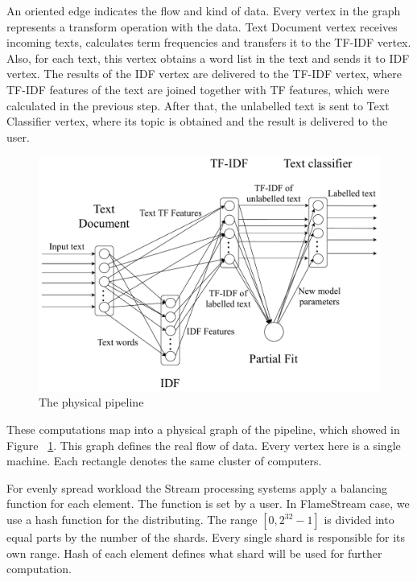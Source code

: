An oriented edge indicates the flow and kind of data. Every vertex in the graph represents a transform operation with the data. Text Document vertex receives incoming texts, calculates term frequencies and transfers it to the TF-IDF vertex. Also, for each text, this vertex obtains a word list in the text and sends it to IDF vertex. The results of the IDF vertex are delivered to the TF-IDF vertex, where TF-IDF features of the text are joined together with TF features, which were calculated in the previous step. After that, the unlabelled text is sent to Text Classifier vertex, where its topic is obtained and the result is delivered to the user.

\begin{figure}[htbp]
  \centering
  \includegraphics[scale=0.375]{pics/physical-graph}
  \caption{The physical pipeline}
  \label {physical graph}
\end{figure}

These computations map into a physical graph of the pipeline, which showed in Figure ~\ref{physical graph}. This graph defines the real flow of data. Every vertex here is a single machine. Each rectangle denotes the same cluster of computers.

For evenly spread workload the Stream processing systems apply a balancing function for each element. The function is set by a user. In FlameStream case, we use a hash function for the distributing. The range $[0, 2^{32}-1]$ is divided into equal parts by the number of the shards. Every single shard is responsible for its own range. Hash of each element defines what shard will be used for further computation.

